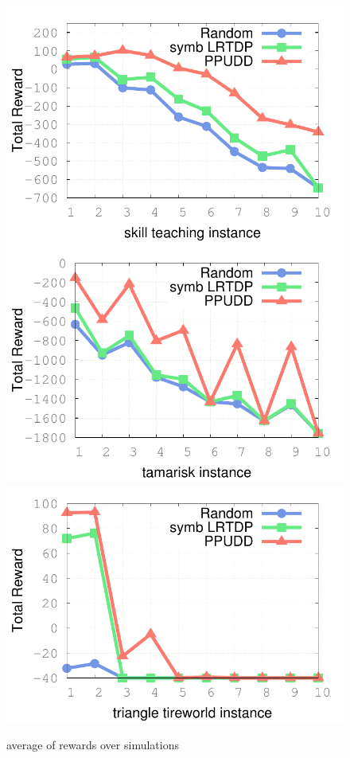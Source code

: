 \documentclass[12pt,svgnames,table]{beamer}
\begin{document}
\begin{frame}
\begin{figure}
\vspace{0.5cm}
\includegraphics[scale=0.3]{IPPC2014_results/skill_teaching.pdf} 
\includegraphics[scale=0.3]{IPPC2014_results/tamarisk.pdf}
\includegraphics[scale=0.3]{IPPC2014_results/triangle_tireworld.pdf} 
\caption{{\color{orange} average of rewards over simulations}}
\end{figure}
\end{frame}
\end{document}
